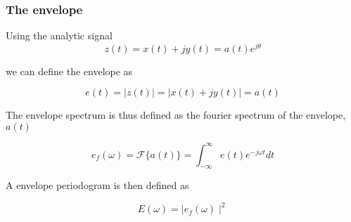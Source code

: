 \begin{frame}
    \frametitle{The envelope}
    \small
    
    Using the analytic signal
    \begin{equation}
        z(t)=x(t)+jy(t) = a(t) e^{j\theta}
    \end{equation}
    
    we can define the envelope as
    
    \begin{equation}
       e(t) = \mid{z(t)}\mid = \mid{x(t) + jy(t)}\mid = a(t)
    \end{equation}
   
   The envelope spectrum is thus defined as the fourier spectrum of the envelope, $a(t)$
   
   \begin{equation}
       e_{f}(\omega) = \mathscr{F}\{a(t)\} = \int_{-\infty}^{\infty} e(t) e^{-j\omega t} dt
   \end{equation}
   
   A envelope periodogram is then defined as 
   
   \begin{equation}
       E(\omega) = \mid{e_{f}(\omega)}\mid^2
   \end{equation}
   
\end{frame}